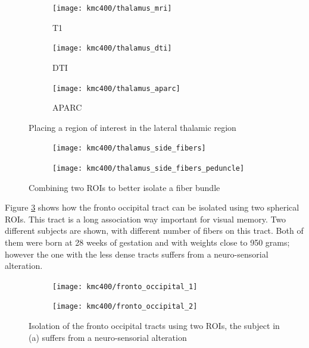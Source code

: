 \begin{figure}
\centering
	\begin{subfigure}{0.3\textwidth}
		\texttt{[image: kmc400/thalamus\_mri]}
		\caption{T1}
	\end{subfigure}
	\begin{subfigure}{0.3\textwidth}
\texttt{[image: kmc400/thalamus\_dti]}
		\caption{DTI}
	\end{subfigure}
	\begin{subfigure}{0.3\textwidth}
\texttt{[image: kmc400/thalamus\_aparc]}
		\caption{APARC}
	\end{subfigure}	
\caption{Placing a region of interest in the lateral thalamic region
\label{fig_thalamus_seed}}
\end{figure}



\begin{figure}
\centering
	\begin{subfigure}{0.45\textwidth}
		\texttt{[image: kmc400/thalamus\_side\_fibers]}
		\caption{}
	\end{subfigure}
	\begin{subfigure}{0.45\textwidth}
\texttt{[image: kmc400/thalamus\_side\_fibers\_peduncle]}
		\caption{}
	\end{subfigure}
\caption{Combining two ROIs to better isolate a fiber bundle
\label{fig_thalamus_fibers}}
\end{figure}



Figure \ref{fig_fronto_occipital} shows how the fronto occipital tract can be isolated using two spherical ROIs. This tract is a long association way  important for visual memory. Two different subjects are shown, with different number of fibers on this tract. Both of them were born at 28 weeks of gestation and with weights close to 950 grams; however the one with the less dense tracts suffers from a neuro-sensorial alteration.

\begin{figure}
\centering
	\begin{subfigure}{0.45\textwidth}
		\texttt{[image: kmc400/fronto\_occipital\_1]}
		\caption{}
	\end{subfigure}
	\begin{subfigure}{0.45\textwidth}
\texttt{[image: kmc400/fronto\_occipital\_2]}
		\caption{}
	\end{subfigure}
\caption{Isolation of the fronto occipital tracts using two ROIs, the subject in (a) suffers from a neuro-sensorial alteration
\label{fig_fronto_occipital}}
\end{figure}


